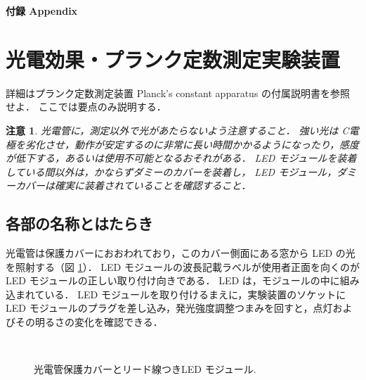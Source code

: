 \documentclass[11pt,sort]{jarticle}
\newtheorem{caution}{注意}
\begin{document}




\newpage
\appendix
\noindent
{\LARGE\bf 付録 Appendix}

\section{光電効果・プランク定数測定実験装置}\label{apdx:aparatus}

詳細はプランク定数測定装置 Planck's constant apparatus の付属説明書を参照せよ．
ここでは要点のみ説明する．

\begin{caution}
光電管に，測定以外で光があたらないよう注意すること．
強い光は C電極を劣化させ，動作が安定するのに非常に長い時間かかるようになったり，感度が低下する，あるいは使用不可能となるおそれがある．
LED モジュールを装着している間以外は，かならずダミーのカバーを装着し，
LED モジュール，ダミーカバーは確実に装着されていることを確認すること．
\end{caution}

\subsection{各部の名称とはたらき}

光電管は保護カバーにおおわれており，このカバー側面にある窓から LED の光を照射する（図 \ref{fig:phototube_cover}）．
LED モジュールの波長記載ラベルが使用者正面を向くのが LED モジュールの正しい取り付け向きである．
LED は，モジュールの中に組み込まれている．
LED モジュールを取り付けるまえに，実験装置のソケットに LED モジュールのプラグを差し込み，発光強度調整つまみを回すと，点灯およびその明るさの変化を確認できる．

\begin{figure}[t]
\begin{center}
\\
\caption{光電管保護カバーとリード線つきLED モジュール. }\label{fig:phototube_cover} 
\end{center}
\end{figure}
\end{document}
